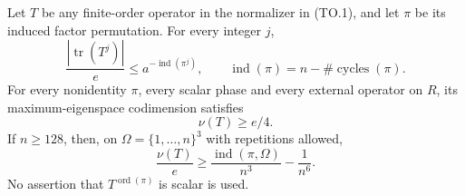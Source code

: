 \begin{lemma}[D-TD14]
Let \(T\) be any finite-order operator in the normalizer in (TO.1),
and let \(\pi\) be its induced factor permutation. For every integer \(j\),
\[
       \frac{|\operatorname{tr}(T^j)|}{e}
                   \le a^{-\operatorname{ind}(\pi^j)},
 \qquad
 \operatorname{ind}(\pi)=n-\#\operatorname{cycles}(\pi).
 \tag{TO.3}
\]
For every nonidentity \(\pi\), every scalar phase and every external
operator on \(R\), its maximum-eigenspace codimension satisfies
\[
                        \nu(T)\ge e/4.
 \tag{TO.4}
\]
If \(n\ge128\), then, on
\(\Omega=\{1,\ldots,n\}^3\) with repetitions allowed,
\[
      \frac{\nu(T)}e
       \ge\frac{\operatorname{ind}(\pi,\Omega)}{n^3}
                       -\frac1{n^6}.
 \tag{TO.5}
\]
No assertion that \(T^{\operatorname{ord}(\pi)}\) is scalar is used.
\end{lemma}

